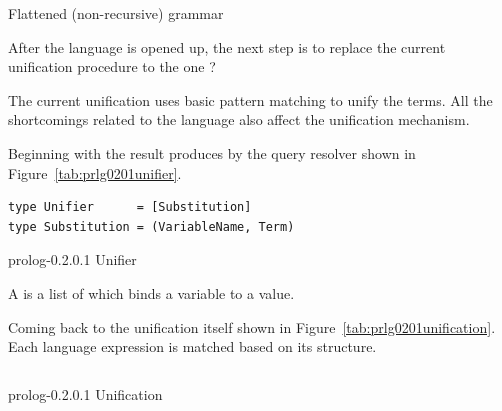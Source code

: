\documentclass[thesis-solanki.tex]{subfiles}
\begin{document}
\begin{code-list}[th]
  \begin{singlespace}
    \inputminted[linenos]{haskell}{haskell-proto2-flattened-rarefy.hs}
  \end{singlespace}
  \caption{Flattened (non-recursive) grammar}
\label{tab:flatgrp0201}
\end{code-list}


After the language is opened up, the next step is to replace the current unification procedure to the one {\Huge
  ?}


The current unification uses basic pattern matching to unify the terms.
All the shortcomings related to the language also affect the unification mechanism.

Beginning with the result produces by the query resolver shown in Figure~\ref{tab:prlg0201unifier}.
\begin{code-list}[h]
\begin{verbatim}
type Unifier      = [Substitution]
type Substitution = (VariableName, Term)
\end{verbatim}
\caption{prolog-0.2.0.1 Unifier}
\label{tab:prlg0201unifier}
\end{code-list}
A  is a list of  which binds a variable to a value.

Coming back to the unification itself shown in Figure~\ref{tab:prlg0201unification}.
Each language expression is matched based on its structure.

\begin{code-list}[h]
  \begin{singlespace}
    \inputminted[linenos]{haskell}{haskell-proto2-unification-lion.hs}
  \end{singlespace}
\caption{prolog-0.2.0.1 Unification}
\label{tab:prlg0201unification}
\end{code-list}
\end{document}
